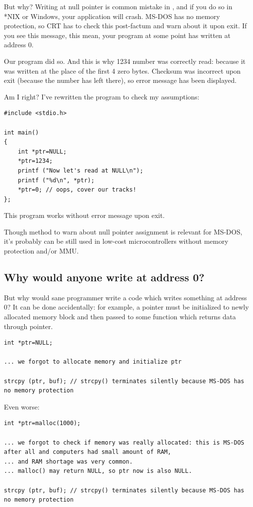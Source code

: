 But why? Writing at null pointer is common mistake in \CCpp, and if you do so in *NIX or Windows, your application will crash.
MS-DOS has no memory protection, so CRT has to check this post-factum and warn about it upon exit.
If you see this message, this mean, your program at some point has written at address 0.

Our program did so. And this is why 1234 number was correctly read: because it was written at the place of the first 4 zero bytes.
Checksum was incorrect upon exit (because the number has left there), so error message has been displayed.

Am I right?
I've rewritten the program to check my assumptions:

\begin{lstlisting}
#include <stdio.h>

int main()
{
	int *ptr=NULL;
	*ptr=1234;
	printf ("Now let's read at NULL\n");
	printf ("%d\n", *ptr);
	*ptr=0; // oops, cover our tracks!
};
\end{lstlisting}

This program works without error message upon exit.

Though method to warn about null pointer assignment is relevant for MS-DOS,
it's probably can be still used in low-cost microcontrollers without memory protection and/or \ac{MMU}.

\subsection{Why would anyone write at address 0?}

But why would sane programmer write a code which writes something at address 0?
It can be done accidentally: for example, a pointer must be initialized to newly allocated memory block and then passed to some function which returns data through pointer.

\begin{lstlisting}
int *ptr=NULL;

... we forgot to allocate memory and initialize ptr

strcpy (ptr, buf); // strcpy() terminates silently because MS-DOS has no memory protection
\end{lstlisting}

Even worse:

\begin{lstlisting}
int *ptr=malloc(1000);

... we forgot to check if memory was really allocated: this is MS-DOS after all and computers had small amount of RAM,
... and RAM shortage was very common.
... malloc() may return NULL, so ptr now is also NULL.

strcpy (ptr, buf); // strcpy() terminates silently because MS-DOS has no memory protection
\end{lstlisting}

